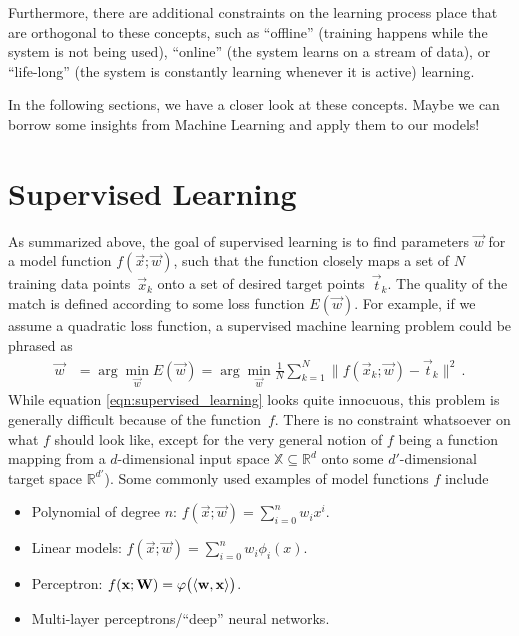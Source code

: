 \documentclass[10pt,letterpaper,oneside]{article}
\begin{document}
Furthermore, there are additional constraints on the learning process place that are orthogonal to these concepts, such as \enquote{offline} (training happens while the system is not being used), \enquote{online} (the system learns on a stream of data), or \enquote{life-long} (the system is constantly learning whenever it is active) learning.

In the following sections, we have a closer look at these concepts. Maybe we can borrow some insights from Machine Learning and apply them to our models!

\section{Supervised Learning}

As summarized above, the goal of supervised learning is to find parameters $\vec w$ for a model function $f(\vec x; \vec w)$, such that the function closely maps a set of $N$ training data points~$\vec x_k$ onto a set of desired target points~$\vec t_k$. The quality of the match is defined according to some loss function $E(\vec w)$. For example, if we assume a quadratic loss function, a supervised machine learning problem could be phrased as
\begin{align}
	\vec w &= \arg \min_{\vec w} E(\vec w) = \arg \min_{\vec w} \frac{1}{N} \sum_{k = 1}^N \big\| f(\vec x_k ; \vec w) - \vec t_k \big\|^2 \,.
	\label{eqn:supervised_learning}
\end{align}
While equation \cref{eqn:supervised_learning} looks quite innocuous, this problem is generally difficult because of the function~$f$. There is no constraint whatsoever on what $f$ should look like, except for the very general notion of $f$ being a function mapping from a $d$-dimensional input space $\mathbb{X} \subseteq \mathbb{R}^d$ onto some $d'$-dimensional target space $\mathbb{R}^{d'}$).  Some commonly used examples of model functions $f$ include
\begin{itemize}
	\item Polynomial of degree $n$: $f(\vec x; \vec w) = \sum_{i = 0}^n w_i x^i$.
	\item Linear models: $f(\vec x; \vec w) = \sum_{i = 0}^n w_i \phi_i(x)$.
	\item Perceptron: $f({\mathbf{x}}; {\mathbf{W}}) = \varphi\big(\langle {\mathbf{w}}, {\mathbf{x}} \rangle \big)$.
	\item Multi-layer perceptrons/\enquote{deep} neural networks.
\end{itemize}
\end{document}
